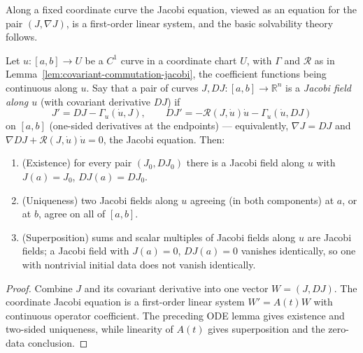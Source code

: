 Along a fixed coordinate curve the Jacobi equation, viewed as an
equation for the pair $(J,\nabla J)$, is a first-order linear
system, and the basic solvability theory follows.

\begin{lemma}
\label{lem:jacobi-field-coordinates}
\leanok



Let $u\colon[a,b]\to U$ be a $C^1$ curve in a coordinate chart $U$,
with $\Gamma$ and ${\mathcal R}$ as in
Lemma~\ref{lem:covariant-commutation-jacobi}, the coefficient
functions being continuous along $u$. Say that a pair of curves
$J,DJ\colon[a,b]\to\mathbb{R}^n$ is a {\em Jacobi field along $u$}
(with covariant derivative $DJ$) if
$$J'=DJ-\Gamma_u(\dot u,J),\qquad
DJ'=-{\mathcal R}(J,\dot u)\dot u-\Gamma_u(\dot u,DJ)$$
on $[a,b]$ (one-sided derivatives at the endpoints) — equivalently,
$\nabla J=DJ$ and $\nabla DJ+{\mathcal R}(J,\dot u)\dot u=0$, the
Jacobi equation. Then:
\begin{enumerate}
\item (Existence) for every pair $(J_0,DJ_0)$ there is a Jacobi
field along $u$ with $J(a)=J_0$, $DJ(a)=DJ_0$.
\item (Uniqueness) two Jacobi fields along $u$ agreeing (in both
components) at $a$, or at $b$, agree on all of $[a,b]$.
\item (Superposition) sums and scalar multiples of Jacobi fields
along $u$ are Jacobi fields; a Jacobi field with $J(a)=0$,
$DJ(a)=0$ vanishes identically, so one with nontrivial initial
data does not vanish identically.
\end{enumerate}
\end{lemma}

\begin{proof}
\sketch
\leanok
{}
Combine $J$ and its covariant derivative into one vector $W=(J,DJ)$. The coordinate Jacobi equation is a first-order linear system $W'=A(t)W$ with continuous operator coefficient. The preceding ODE lemma gives existence and two-sided uniqueness, while linearity of $A(t)$ gives superposition and the zero-data conclusion.
\end{proof}

